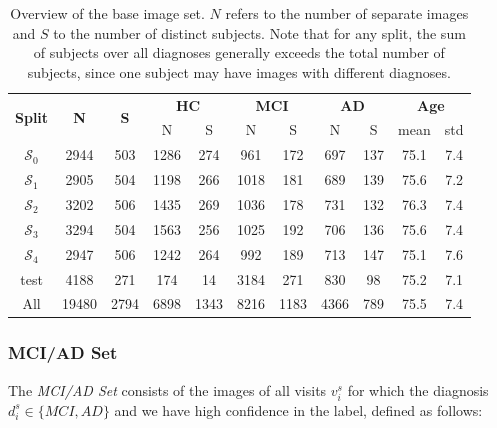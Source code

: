 \begin{table}[h]
	\begin{center}
		\begin{tabular}{c c c c c c c c c c c}
			\toprule
			\multirow{2}{*}{\bfseries Split} & 
			\multirow{2}{*}{\bfseries N} & 
			\multirow{2}{*}{\bfseries S} & 
			\multicolumn{2}{c}{\bfseries HC} & 
			\multicolumn{2}{c}{\bfseries MCI} & 
			\multicolumn{2}{c}{\bfseries AD} &
			\multicolumn{2}{c}{\bfseries Age} \\
			\cmidrule(lr){4-5}
			\cmidrule(lr){6-7}
			\cmidrule(lr){8-9}
			\cmidrule(lr){10-11} 
			& & & N & S & N & S & N & S & mean & std \\ 
			\cmidrule(lr){1-11}
			$\mathcal{S}_0$ &  2944 &  503 & 1286 &  274 &  961 &  172 &  697 & 137 & 75.1 & 7.4 \\
			$\mathcal{S}_1$ &  2905 &  504 & 1198 &  266 & 1018 &  181 &  689 & 139 & 75.6 & 7.2 \\
			$\mathcal{S}_2$ &  3202 &  506 & 1435 &  269 & 1036 &  178 &  731 & 132 & 76.3 & 7.4 \\
			$\mathcal{S}_3$ &  3294 &  504 & 1563 &  256 & 1025 &  192 &  706 & 136 & 75.6 & 7.4 \\
			$\mathcal{S}_4$ &  2947 &  506 & 1242 &  264 &  992 &  189 &  713 & 147 & 75.1 & 7.6 \\
			test            &  4188 &  271 &  174 &   14 & 3184 &  271 &  830 &  98 & 75.2 & 7.1 \\
			\cmidrule(lr){1-11}
			All             & 19480 & 2794 & 6898 & 1343 & 8216 & 1183 & 4366 & 789 & 75.5 & 7.4 \\
			\bottomrule
		\end{tabular}
		\caption{Overview of the base image set. $N$ refers to the number of separate images and $S$ to the number of distinct subjects. Note that for any split, the sum of subjects over all diagnoses generally exceeds the total number of subjects, since one subject may have images with different diagnoses.}
		\label{tab:baseset}
	\end{center}
\end{table}

\subsubsection*{MCI/AD Set} \label{sec:datmciad}
The \textit{MCI/AD Set} consists of the images of all visits $v^s_i$ for which the diagnosis $d^s_i \in \{MCI, AD\}$ and we have high confidence in the label, defined as follows:

